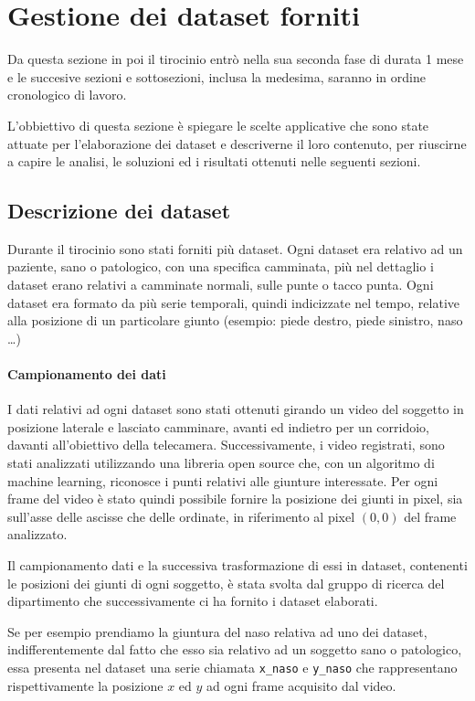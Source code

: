 \section{Gestione dei dataset forniti}
Da questa sezione in poi il tirocinio entrò nella sua seconda fase di durata 1 mese e le succesive
sezioni e sottosezioni, inclusa la medesima, saranno in ordine cronologico di lavoro.

L'obbiettivo di questa sezione è spiegare le scelte applicative che sono state attuate
per l'elaborazione dei dataset e descriverne il loro contenuto, per 
riuscirne a capire le analisi, le soluzioni ed i risultati ottenuti nelle seguenti sezioni. 




\subsection{Descrizione dei dataset}
Durante il tirocinio sono stati forniti più dataset.
Ogni dataset era relativo ad un paziente, sano o patologico, con una specifica camminata,
più nel dettaglio i dataset erano relativi a camminate normali, sulle punte o tacco punta.
Ogni dataset era formato da più serie temporali, quindi indicizzate nel tempo, relative
alla posizione di un particolare giunto (esempio: piede destro, piede sinistro, naso \dots)

\paragraph{Campionamento dei dati} I dati relativi ad ogni dataset sono stati ottenuti girando un video del soggetto in posizione
laterale e lasciato camminare, avanti ed indietro per un corridoio, davanti all'obiettivo della telecamera. 
Successivamente, i video registrati, sono stati analizzati utilizzando una libreria open source che, con un algoritmo
di machine learning, riconosce i punti relativi alle giunture interessate. Per ogni frame del video
è stato quindi possibile fornire la posizione dei giunti in pixel, sia sull'asse delle
ascisse che delle ordinate, in riferimento al pixel $(0,0)$ del frame analizzato.

Il campionamento dati e la successiva trasformazione di essi in dataset, contenenti le posizioni
dei giunti di ogni soggetto, è stata svolta dal gruppo di ricerca del dipartimento che successivamente
ci ha fornito i dataset elaborati.


\begin{esempio}
    Se per esempio prendiamo la giuntura del naso relativa ad uno dei dataset, indifferentemente
    dal fatto che esso sia relativo ad un soggetto sano o patologico, essa presenta nel dataset una serie
    chiamata \texttt{x\_naso} e \texttt{y\_naso} che rappresentano rispettivamente 
    la posizione $x$ ed $y$ ad ogni frame acquisito dal video.
\end{esempio}

